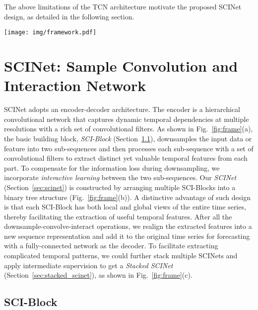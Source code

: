 \documentclass{article}
\begin{document}
The above limitations of the TCN architecture motivate the proposed SCINet design, as detailed in the following section. 







\begin{figure*}[htbp]	
\centering
\texttt{[image: img/framework.pdf]}
\caption{The overall architecture of Sample Convolution and Interaction Network (SCINet).}
\label{fig:frame}
\vspace{-5pt}
\end{figure*}


\section{SCINet: Sample Convolution and Interaction Network}
\label{sec:sci_network}



SCINet adopts an encoder-decoder architecture. The encoder is a hierarchical convolutional network that captures dynamic temporal dependencies at multiple resolutions with a rich set of convolutional filters. As shown in Fig.~\ref{fig:frame}(a), the basic building block, \textit{SCI-Block} (Section~\ref{sec:sciblock}), downsamples the input data or feature into two sub-sequences and then processes each sub-sequence with a set of convolutional filters to extract distinct yet valuable temporal features from each part. To compensate for the information loss during downsampling, we incorporate \textit{interactive learning} between the two sub-sequences. 
Our \textit{SCINet} (Section~\ref{sec:scinet}) is constructed by arranging multiple SCI-Blocks into a binary tree structure (Fig.~\ref{fig:frame}(b)). A distinctive advantage of such design is that each SCI-Block has both local and global views of the entire time series, thereby facilitating the extraction of useful temporal features. 
After all the downsample-convolve-interact operations, we realign the extracted features into a new sequence representation and add it to the original time series for forecasting with a fully-connected network as the decoder.  
To facilitate extracting complicated temporal patterns, we could further stack multiple SCINets and apply intermediate supervision to get a \textit{Stacked SCINet} (Section~\ref{sec:stacked_scinet}), as shown in Fig.~\ref{fig:frame}(c). 






\subsection{SCI-Block}\label{sec:sciblock}
\end{document}
